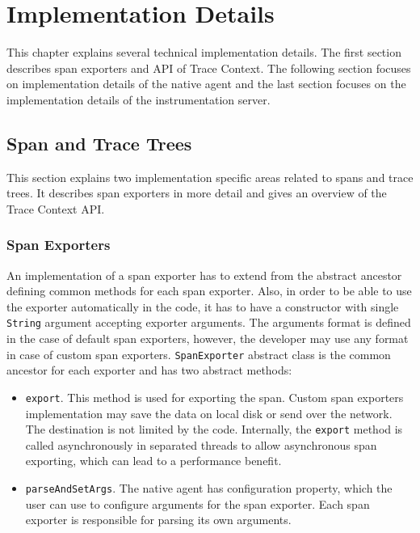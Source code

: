 \chapter{Implementation Details}
\label{chap:implementation}
This chapter explains several technical implementation details. The first section describes span exporters and API of Trace Context. The following section focuses on implementation details of the native agent and the last section focuses on the implementation details of the instrumentation server.

\section{Span and Trace Trees}
This section explains two implementation specific areas related to spans and trace trees. It describes span exporters in more detail and gives an overview of the Trace Context API. 
\subsection{Span Exporters}
\label{imp:exporter}
An implementation of a span exporter has to extend from the abstract ancestor defining common methods for each span exporter. Also, in order to be able to use the exporter automatically in the code, it has to have a constructor with single \texttt{String} argument accepting exporter arguments. The arguments format is defined in the case of default span exporters, however, the developer may use any format in case of custom span exporters. \texttt{SpanExporter} abstract class is the common ancestor for each exporter and has two abstract methods:
\begin{itemize}
	\item \texttt{export}. This method is used for exporting the span. Custom span exporters implementation may save the data on local disk or send over the network. The destination is not limited by the code. Internally, the \texttt{export} method is called asynchronously in separated threads to allow asynchronous span exporting, which can lead to a performance benefit.
	\item \texttt{parseAndSetArgs}. The native agent has configuration property, which the user can use to configure arguments for the span exporter. Each span exporter is responsible for parsing its own arguments.
\end{itemize}

